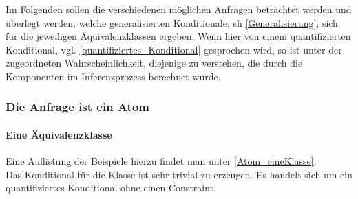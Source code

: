 \documentclass[a4paper, 11pt]{book}
\begin{document}
Im Folgenden sollen die verschiedenen möglichen Anfragen betrachtet werden und überlegt werden, welche generalisierten Konditionale, sh \ref{Generalisierung},  sich für die jeweiligen Äquivalenzklassen ergeben. Wenn hier von einem quantifizierten Konditional, vgl. \ref{quantifiziertes_Konditional} gesprochen wird, so ist unter der zugeordneten Wahrscheinlichkeit, diejenige zu verstehen, die durch die Komponenten im Inferenzprozess berechnet wurde.
\subsubsection {Die Anfrage ist ein Atom} 
\paragraph{ Eine Äquivalenzklasse}
Eine Auflistung der Beispiele hierzu findet man unter \ref{Atom_eineKlasse}.\\
Das Konditional für die Klasse ist sehr trivial zu erzeugen. Es handelt sich um ein quantifiziertes Konditional ohne einen Constraint.
\end{document}
